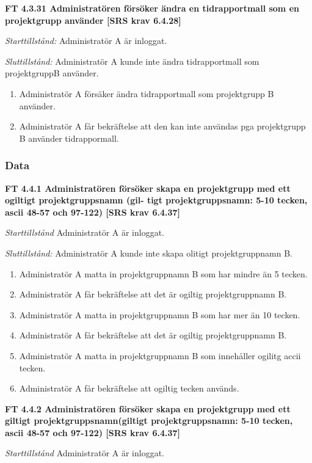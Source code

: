 \documentclass[a4paper]{article}
\begin{document}
\textbf{FT 4.3.31 Administratören försöker ändra en tidrapportmall som en projektgrupp använder [SRS krav 6.4.28]}

\emph{Starttillstånd:} Administratör A är inloggat.

\emph{Sluttillstånd:} Administratör A kunde inte ändra  tidrapportmall som projektgruppB använder.

\begin{enumerate}
\item Administratör A försäker ändra tidrapportmall som projektgrupp B använder.
\item Administratör A får bekräftelse att  den kan inte användas pga projektgrupp B använder tidrappormall. 
\end{enumerate}


\subsubsection{Data}
 
\textbf{FT 4.4.1 Administratören försöker skapa en projektgrupp med ett ogiltigt projektgruppsnamn (gil- tigt projektgruppsnamn: 5-10 tecken, ascii 48-57 och 97-122) [SRS krav 6.4.37]}

\emph{Starttillstånd} Administratör A  är inloggat.

\emph{Sluttillstånd:} Administratör A kunde inte skapa olitigt projektgruppnamn B.

\begin{enumerate}
\item Administratör A matta in projektgruppnamn B som har mindre än 5 tecken.
\item Administratör A får bekräftelse att det är ogiltig projektgruppnamn B.
\item Administratör A matta in projektgruppnamn B som har mer än 10 tecken.
\item Administratör A får bekräftelse att det är ogiltig projektgruppnamn B.
\item Administratör A matta in projektgruppnamn B  som innehåller ogilitg accii tecken.
\item Administratör A får bekräftelse att ogiltig tecken används.
\end{enumerate}

\textbf{FT 4.4.2 Administratören försöker skapa en projektgrupp med ett giltigt projektgruppsnamn(giltigt projektgruppsnamn: 5-10 tecken, ascii 48-57 och 97-122) [SRS krav 6.4.37]}

\emph{Starttillstånd} Administratör A  är inloggat.
\end{document}
